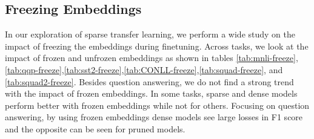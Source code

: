 \subsection{Freezing Embeddings}
\label{sec:sparse-transfer-freeze-embd}
In our exploration of sparse transfer learning, we perform a wide study on the impact of freezing the embeddings during finetuning. Across tasks, we look at the impact of frozen and unfrozen embeddings as shown in tables \ref{tab:mnli-freeze},\ref{tab:qqp-freeze},\ref{tab:sst2-freeze},\ref{tab:CONLL-freeze},\ref{tab:squad-freeze}, and \ref{tab:squad2-freeze}. Besides question answering, we do not find a strong trend with the impact of frozen embeddings. In some tasks, sparse and dense models perform better with frozen embeddings while not for others. Focusing on question answering, by using frozen embeddings dense models see large losses in F1 score and the opposite can be seen for pruned models.   
\begin{table}[!htb]
    \centering
    \caption{Impact of frozen vs trained embeddings on the accuracy (matched) MNLI Dataset across model sizes for the various sizes of oBERTa as compared to the uncompressed baseline}
    \label{tab:mnli-freeze}
\end{table}
